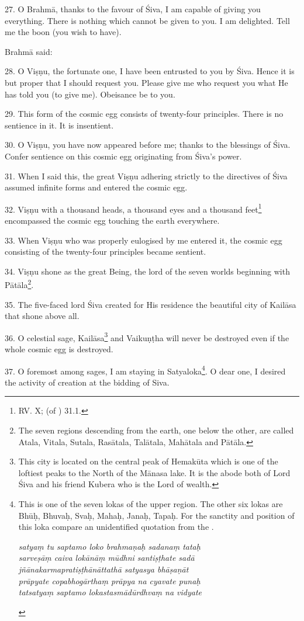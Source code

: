 27. O Brahmā, thanks to the favour of Śiva, I am capable of giving you
everything. There is nothing which cannot be given to you. I am delighted. Tell
me the boon (you wish to have).

Brahmā said:

28. O Viṣṇu, the fortunate one, I have been entrusted to you by Śiva. Hence it
is but proper that I should request you. Please give me who request you what He
has told you (to give me). Obeisance be to you.

29. This  form of the cosmic egg consists of twenty-four principles.
There is no sentience in it. It is insentient.

30. O Viṣṇu, you have now appeared before me; thanks to the blessings of Śiva.
Confer sentience on this cosmic egg originating from Śiva’s power.

31. When I said this, the great Viṣṇu adhering strictly to the directives of
Śiva assumed infinite forms and entered the cosmic egg.

32. Viṣṇu with a thousand heads, a thousand eyes and a thousand feet\footnote{RV.
X;  (of ) 31.1.} encompassed the cosmic
egg touching the earth everywhere.

33. When Viṣṇu who was properly eulogised by me entered it, the cosmic egg
consisting of the twenty-four principles became sentient.

34. Viṣṇu shone as the great Being, the lord of the seven worlds beginning with
Pātāla\footnote{The seven regions descending from the earth, one below the other,
are called Atala, Vitala, Sutala, Rasātala, Talātala, Mahātala and Pātāla.}.

35. The five-faced lord Śiva created for His residence the beautiful city of
Kailāsa that shone above all.

36. O celestial sage, Kailāsa\footnote{This city is located on the central peak
of Hemakūta which is one of the loftiest peaks to the North of the Mānasa lake.
It is the abode both of Lord Śiva and his friend Kubera who is the Lord of
wealth.} and Vaikuṇṭha will never be destroyed even if the whole cosmic egg is
destroyed.

37. O foremost among sages, I am staying in Satyaloka\footnote{This is one of
the seven lokas of the upper region. The other six lokas are Bhūḥ, Bhuvaḥ, Svaḥ,
Mahaḥ, Janaḥ, Tapaḥ. For the sanctity and position of this loka compare an
unidentified quotation from the .

\begin{shloka}\itshape
  satyaṃ tu saptamo loko brahmaṇaḥ sadanaṃ tataḥ\\
  sarveṣāṃ caiva lokānāṃ mūdhni santiṣṭhate sadā\\
  jñānakarmapratiṣṭhānāttathā satyasya bhāṣaṇāt\\
  prāpyate copabhogārthaṃ prāpya na cyavate punaḥ\\
  tatsatyaṃ saptamo lokastasmādūrdhvaṃ na vidyate
\end{shloka}
}. O dear one, I desired the activity of creation at the bidding of Siva.

